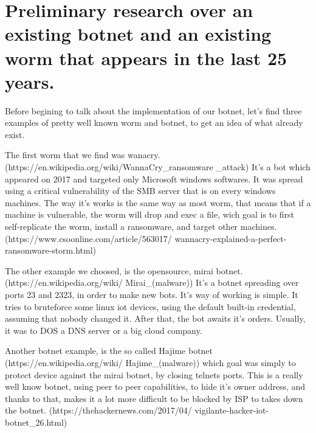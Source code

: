 \documentclass[../main.tex]{subfiles}
\begin{document}
	\vspace{10pt}
    
    \section{Preliminary research over an existing botnet and an existing worm that appears in the last 25 years.}

    Before begining to talk about the implementation of our botnet, let's find three examples of pretty well known worm and botnet, to get an idea of what already exist.

    The first worm that we find was wanacry. 
    (https://en.wikipedia.org/wiki/WannaCry\_ransomware
    \_attack)
    It's a bot which appeared on 2017 and targeted only Microsoft windows softwares.
    It was spread using a critical vulnerability of the SMB server that is on every windows machines.
    The way it's works is the same way as most worm, that means that if a machine is vulnerable, the worm will drop and exec a file, wich goal is to first self-replicate the worm, install a ransomware, and target other machines. 
    (https://www.csoonline.com/article/563017/
    wannacry-explained-a-perfect-ransomware-storm.html)

    The other example we choosed, is the opensource, mirai botnet.
    (https://en.wikipedia.org/wiki/
    Mirai\_(malware))
    It's a botnet spreading over ports 23 and 2323, in order to make new bots.
    It's way of working is simple.
    It tries to bruteforce some linux iot devices, using the default built-in credential, assuming that nobody changed it.
    After that, the bot awaits it's orders.
    Usually, it was to DOS a DNS server or a big cloud company.

    Another botnet example, is the so called Hajime botnet
    (https://en.wikipedia.org/wiki/
    Hajime\_(malware))
    which goal was simply to protect device against the mirai botnet, by closing telnets ports.
    This is a really well know botnet, using peer to peer capabilities, to hide it's owner address, and thanks to that, makes it a lot more difficult to be blocked by ISP to takes down the botnet.
    (https://thehackernews.com/2017/04/
    vigilante-hacker-iot-botnet\_26.html)
\end{document}
